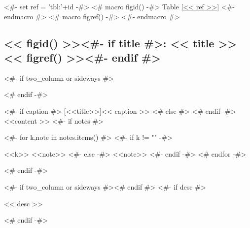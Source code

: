 <#- set ref = 'tbl:'+id -#>
<# macro figid() -#>
Table \ref{<< ref >>}
<#- endmacro #>
<# macro figref() -#>
\color{light-gray}
<#- endmacro #>

\begin{samepage}
  \subsection[<< figid() >><#- if title #>: \textit{<< title >>}<#- endif #>~~\small{<< figref() >>}]%
  {<< figid() >><#- if title #>: \GothamLight\small{<< title >>} \hfill << figref() >><#- endif #>}
\nopagebreak
<#- if two_column or sideways #>
\begin{adjustbox}{width=\textwidth,center}
<# endif -#>
\begin{threeparttable}
  <#- if caption #>
  [<<title>>]{<< caption >>}
  <# else #>
  <# endif -#>\label{<< ref >>}
  <<content >>
  <#- if notes #>
  \begin{tablenotes}
    <#- for k,note in notes.items() #>
    <#- if k != "" -#>
    \item [<<k>>] <<note>>
    <#- else -#>
    <<note>>
    <#- endif -#>
    <# endfor -#>
  \end{tablenotes}
  <# endif -#>
\end{threeparttable}
<#- if two_column or sideways #>\end{adjustbox}<# endif #>
<#- if desc #>
\nopagebreak
\begin{figinfo}<< desc >>\end{figinfo}
<# endif -#>
\end{samepage}
\pagebreak

